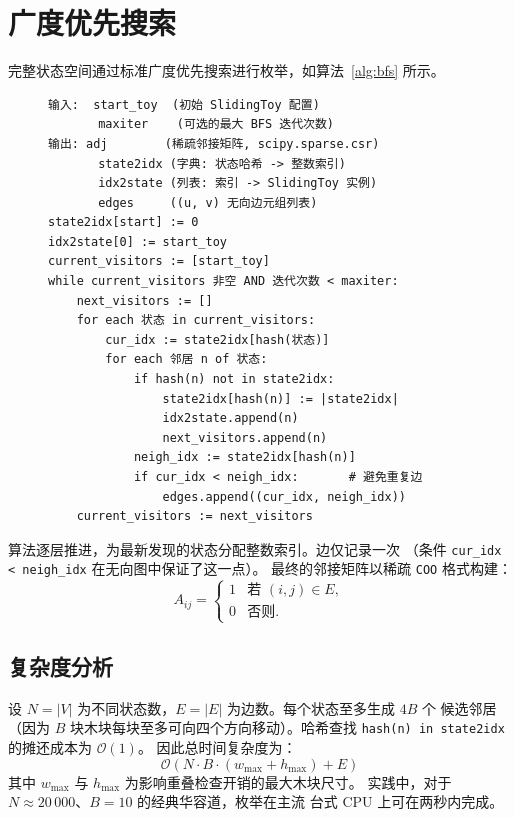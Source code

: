\documentclass[11pt,a4paper]{report}
\begin{document}
\section{广度优先搜索}
\label{sec:bfs}
完整状态空间通过标准广度优先搜索进行枚举，如算法~\ref{alg:bfs} 所示。
\begin{figure}[htbp]
\begin{lstlisting}[style=pythonstyle,numbers=none,
    caption={构建全局状态空间图},
    label=alg:bfs]
输入:  start_toy  (初始 SlidingToy 配置)
       maxiter    (可选的最大 BFS 迭代次数)
输出: adj        (稀疏邻接矩阵, scipy.sparse.csr)
       state2idx (字典: 状态哈希 -> 整数索引)
       idx2state (列表: 索引 -> SlidingToy 实例)
       edges     ((u, v) 无向边元组列表)
state2idx[start] := 0
idx2state[0] := start_toy
current_visitors := [start_toy]
while current_visitors 非空 AND 迭代次数 < maxiter:
    next_visitors := []
    for each 状态 in current_visitors:
        cur_idx := state2idx[hash(状态)]
        for each 邻居 n of 状态:
            if hash(n) not in state2idx:
                state2idx[hash(n)] := |state2idx|
                idx2state.append(n)
                next_visitors.append(n)
            neigh_idx := state2idx[hash(n)]
            if cur_idx < neigh_idx:       # 避免重复边
                edges.append((cur_idx, neigh_idx))
    current_visitors := next_visitors
\end{lstlisting}
\end{figure}
算法逐层推进，为最新发现的状态分配整数索引。边仅记录一次
（条件 \lstinline{cur_idx < neigh_idx} 在无向图中保证了这一点）。
最终的邻接矩阵以稀疏 \texttt{COO} 格式构建：
\begin{equation}
    A_{ij} = \begin{cases}
        1 & \text{若 } (i,j) \in E, \\
        0 & \text{否则}.
    \end{cases}
\end{equation}
\subsection{复杂度分析}
\label{sec:complexity}
设 $N = |V|$ 为不同状态数，$E = |E|$ 为边数。每个状态至多生成 $4B$ 个
候选邻居（因为 $B$ 块木块每块至多可向四个方向移动）。哈希查找
\lstinline{hash(n) in state2idx} 的摊还成本为 $\mathcal{O}(1)$。
因此总时间复杂度为：
\begin{equation}
    \mathcal{O}(N \cdot B \cdot (w_{\max} + h_{\max}) + E)
\end{equation}
其中 $w_{\max}$ 与 $h_{\max}$ 为影响重叠检查开销的最大木块尺寸。
实践中，对于 $N \approx 20\,000$、$B = 10$ 的经典华容道，枚举在主流
台式 CPU 上可在两秒内完成。
\end{document}
